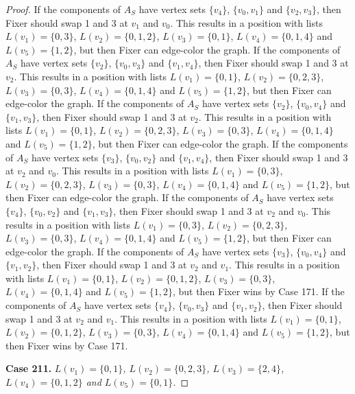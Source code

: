 \documentclass[12pt]{amsart}
\theoremstyle{plain}
\theoremstyle{definition}
\theoremstyle{remark}
\begin{document}
\begin{proof}
If the components of $A_S$ have vertex sets $\{v_4\}$, $\{v_0, v_1\}$ and $\{v_2, v_3\}$, then Fixer should swap 1 and 3 at $v_1$ and $v_0$. This results in a position with lists $L(v_1) = \{0, 3\}$, $L(v_2) = \{0, 1, 2\}$, $L(v_3) = \{0, 1\}$, $L(v_4) = \{0, 1, 4\}$ and $L(v_5) = \{1, 2\}$, but then Fixer can edge-color the graph.
If the components of $A_S$ have vertex sets $\{v_2\}$, $\{v_0, v_3\}$ and $\{v_1, v_4\}$, then Fixer should swap 1 and 3 at $v_2$. This results in a position with lists $L(v_1) = \{0, 1\}$, $L(v_2) = \{0, 2, 3\}$, $L(v_3) = \{0, 3\}$, $L(v_4) = \{0, 1, 4\}$ and $L(v_5) = \{1, 2\}$, but then Fixer can edge-color the graph.
If the components of $A_S$ have vertex sets $\{v_2\}$, $\{v_0, v_4\}$ and $\{v_1, v_3\}$, then Fixer should swap 1 and 3 at $v_2$. This results in a position with lists $L(v_1) = \{0, 1\}$, $L(v_2) = \{0, 2, 3\}$, $L(v_3) = \{0, 3\}$, $L(v_4) = \{0, 1, 4\}$ and $L(v_5) = \{1, 2\}$, but then Fixer can edge-color the graph.
If the components of $A_S$ have vertex sets $\{v_3\}$, $\{v_0, v_2\}$ and $\{v_1, v_4\}$, then Fixer should swap 1 and 3 at $v_2$ and $v_0$. This results in a position with lists $L(v_1) = \{0, 3\}$, $L(v_2) = \{0, 2, 3\}$, $L(v_3) = \{0, 3\}$, $L(v_4) = \{0, 1, 4\}$ and $L(v_5) = \{1, 2\}$, but then Fixer can edge-color the graph.
If the components of $A_S$ have vertex sets $\{v_4\}$, $\{v_0, v_2\}$ and $\{v_1, v_3\}$, then Fixer should swap 1 and 3 at $v_2$ and $v_0$. This results in a position with lists $L(v_1) = \{0, 3\}$, $L(v_2) = \{0, 2, 3\}$, $L(v_3) = \{0, 3\}$, $L(v_4) = \{0, 1, 4\}$ and $L(v_5) = \{1, 2\}$, but then Fixer can edge-color the graph.
If the components of $A_S$ have vertex sets $\{v_3\}$, $\{v_0, v_4\}$ and $\{v_1, v_2\}$, then Fixer should swap 1 and 3 at $v_2$ and $v_1$. This results in a position with lists $L(v_1) = \{0, 1\}$, $L(v_2) = \{0, 1, 2\}$, $L(v_3) = \{0, 3\}$, $L(v_4) = \{0, 1, 4\}$ and $L(v_5) = \{1, 2\}$, but then Fixer wins by Case 171.
If the components of $A_S$ have vertex sets $\{v_4\}$, $\{v_0, v_3\}$ and $\{v_1, v_2\}$, then Fixer should swap 1 and 3 at $v_2$ and $v_1$. This results in a position with lists $L(v_1) = \{0, 1\}$, $L(v_2) = \{0, 1, 2\}$, $L(v_3) = \{0, 3\}$, $L(v_4) = \{0, 1, 4\}$ and $L(v_5) = \{1, 2\}$, but then Fixer wins by Case 171.

\noindent\textbf{Case 211.  }\textit{$L(v_1) = \{0, 1\}$, $L(v_2) = \{0, 2, 3\}$, $L(v_3) = \{2, 4\}$, $L(v_4) = \{0, 1, 2\}$ and $L(v_5) = \{0, 1\}$.}


\end{proof}
\end{document}
